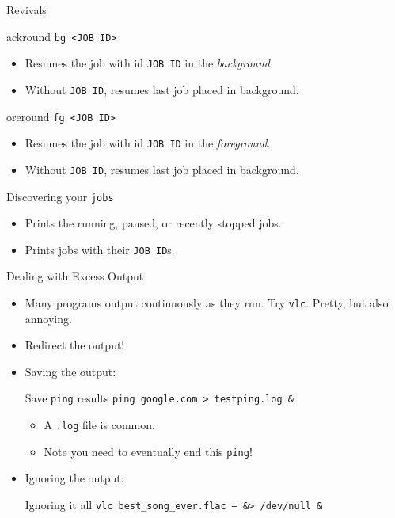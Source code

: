 \begin{frame}[fragile]{Revivals}
  \begin{block}{ackround}
    \texttt{bg <JOB ID>}
    \begin{itemize}
      \item Resumes the job with id \texttt{JOB ID} in the \emph{background}
      \item Without \texttt{JOB ID}, resumes last job placed in background.
    \end{itemize}
  \end{block}
  \vspace*{-1ex}
  \begin{block}{oreround}
    \texttt{fg <JOB ID>}
    \begin{itemize}
      \item Resumes the job with id \texttt{JOB ID} in the \emph{foreground}.
      \item Without \texttt{JOB ID}, resumes last job placed in background.
    \end{itemize}
  \end{block}
  \vspace*{-1ex}
  \begin{block}{Discovering your }
    \texttt{jobs}
    \begin{itemize}
      \item Prints the running, paused, or recently stopped jobs.
      \item Prints jobs with their \texttt{JOB ID}s.
    \end{itemize}
  \end{block}
\end{frame}

\begin{frame}[fragile]{Dealing with Excess Output}
  \begin{itemize}[<+- | alert@+>]
    \item Many programs output continuously as they run.  Try \texttt{vlc}.  Pretty, but also annoying.
    \item Redirect the output!
    \item Saving the output:
    \begin{block}{Save \texttt{ping} results}
      \texttt{ping google.com > testping.log \&}
      \begin{itemize}
        \item A \texttt{.log} file is common.
        \item Note you need to eventually end this \texttt{ping}!
      \end{itemize}
    \end{block}
    \item Ignoring the output:
    \begin{block}{Ignoring it all}
      \texttt{vlc best\_song\_ever.flac -- \&> /dev/null \&}
    \end{block}
  \end{itemize}
\end{frame}
%

